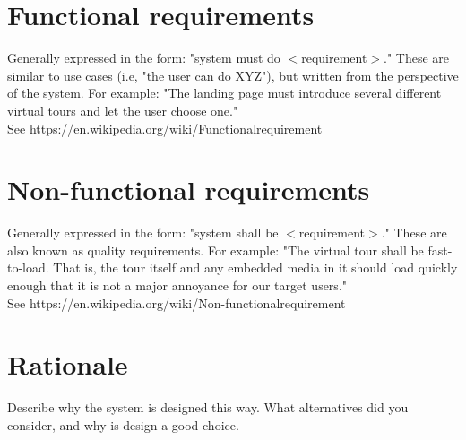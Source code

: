 \section{Functional requirements}
Generally expressed in the form: "system must do $<$requirement$>$." These are similar to use cases (i.e, "the user can do XYZ"), but written from the perspective of the system. For example: "The landing page must introduce several different virtual tours and let the user choose one." \\
See https://en.wikipedia.org/wiki/Functional\textunderscore requirement

\section{Non-functional requirements}
Generally expressed in the form: "system shall be $<$requirement$>$." These are also known as quality requirements. For example: 
"The virtual tour shall be fast-to-load. That is, the tour itself and any embedded media in it should load quickly enough that it is not a major annoyance for our target users." \\
See https://en.wikipedia.org/wiki/Non-functional\textunderscore requirement

\section{Rationale}
Describe why the system is designed this way. What alternatives did you consider, and why is design a good choice.

